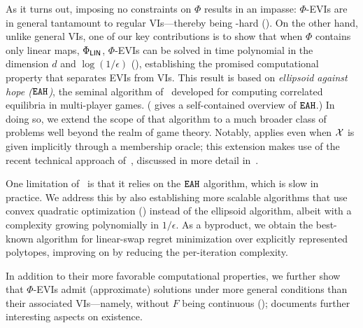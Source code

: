 As it turns out, imposing no constraints on $\Phi$ results in an impasse: $\Phi$-EVIs are in general tantamount to regular VIs---thereby being \PPAD-hard (). On the other hand, unlike general VIs, one of our key contributions is to show that when $\Phi$ contains only linear maps, $\Phi_\mathsf{LIN}$, $\Phi$-EVIs can be solved in time polynomial in the dimension $d$ and $\log(1/\epsilon)$ (), establishing the promised computational property that separates EVIs from VIs. This result is based on \emph{ellipsoid against hope ($\mathtt{EAH}$)}, the seminal algorithm of~\citet{Papadimitriou08:Computing} developed for computing correlated equilibria in multi-player games. ( gives a self-contained overview of $\mathtt{EAH}$.) In doing so, we extend the scope of that algorithm to a much broader class of problems well beyond the realm of game theory. Notably,  applies even when ${\mathcal{X}}$ is given implicitly through a membership oracle; this extension makes use of the recent technical approach of~\citet{Daskalakis24:Efficient}, discussed in more detail in~.

One limitation of~ is that it relies on the $\mathtt{EAH}$ algorithm, 
which is slow in practice. We address this by also establishing more scalable algorithms that use convex quadratic optimization () instead of the ellipsoid algorithm, albeit with a complexity growing polynomially in $1/\epsilon$. As a byproduct, we obtain the best-known algorithm for linear-swap regret minimization over explicitly represented polytopes, improving on \citet{Daskalakis24:Efficient} by reducing the per-iteration complexity.

In addition to their more favorable computational properties, we further show that $\Phi$-EVIs admit (approximate) solutions under more general conditions than their associated VIs---namely, without $F$ being continuous ();  documents further interesting aspects on existence.


